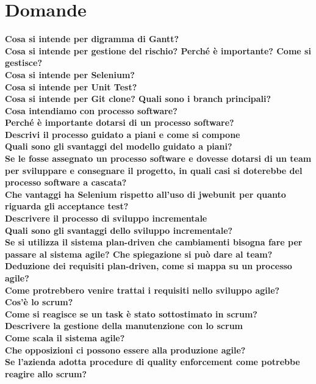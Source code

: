 \section{Domande}
\label{sec:domande}
\textbf{Cosa si intende per digramma di Gantt?}\\
\textbf{Cosa si intende per gestione del rischio? Perché è importante? Come si gestisce?}\\
\textbf{Cosa si intende per Selenium?}\\
\textbf{Cosa si intende per Unit Test?}\\
\textbf{Cosa si intende per Git clone? Quali sono i branch principali?}\\
\textbf{Cosa intendiamo con processo software?}\\
\textbf{Perché è importante dotarsi di un processo software?}\\
\textbf{Descrivi il processo guidato a piani e come si compone}\\
\textbf{Quali sono gli svantaggi del modello guidato a piani?}\\
\textbf{Se le fosse assegnato un processo software e dovesse dotarsi di un team per sviluppare e consegnare il progetto, in quali casi si doterebbe del processo software a cascata?}\\
\textbf{Che vantaggi ha Selenium rispetto all'uso di jwebunit per quanto riguarda gli acceptance test?}\\
\textbf{Descrivere il processo di sviluppo incrementale}\\
\textbf{Quali sono gli svantaggi dello sviluppo incrementale?}\\
\textbf{Se si utilizza il sistema plan-driven che cambiamenti bisogna fare per passare al sistema agile? Che spiegazione si può dare al team?}\\
\textbf{Deduzione dei requisiti plan-driven, come si mappa su un processo agile?}\\
\textbf{Come protrebbero venire trattai i requisiti nello sviluppo agile?}\\
\textbf{Cos'è lo scrum?}\\
\textbf{Come si reagisce se un task è stato sottostimato in scrum?}\\
\textbf{Descrivere la gestione della manutenzione con lo scrum}\\
\textbf{Come scala il sistema agile?}\\
\textbf{Che opposizioni ci possono essere alla produzione agile?}\\
\textbf{Se l'azienda adotta procedure di quality enforcement come potrebbe reagire allo scrum?}\\
